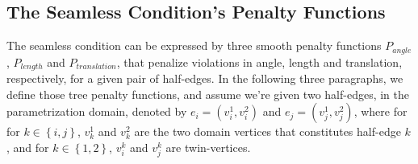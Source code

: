 \subsection{The Seamless Condition's Penalty Functions}
The seamless condition can be expressed by three smooth penalty functions $P_{angle}$, $P_{length}$ and $P_{translation}$, that penalize violations in angle, length and translation, respectively, for a given pair of half-edges. In the following three paragraphs, we define those tree penalty functions, and assume we're given two half-edges, in the parametrization domain, denoted by $e_i = \left(v_i^1,v_i^2\right)$ and $e_j = \left(v_j^1,v_j^2\right)$, where for for $k \in \left\{i,j\right\}$, $v_k^1$ and $v_k^2$ are the two domain vertices that constitutes half-edge $k$, and for $k \in \left\{1,2\right\}$, $v_i^k$ and $v_j^k$ are twin-vertices.
